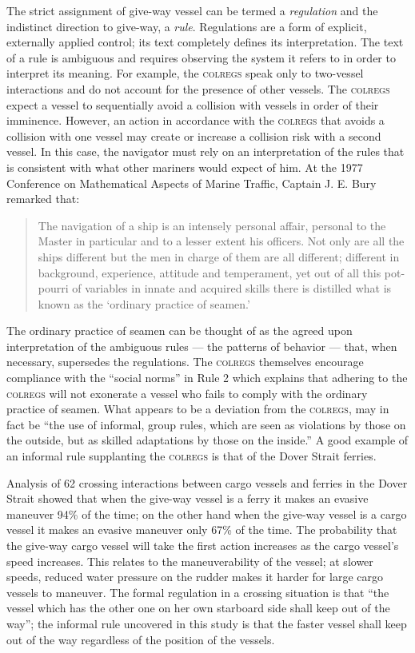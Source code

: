 \documentclass[twoside,symmetric,notoc]{tufte-book}
\begin{document}
\par{%
The strict assignment of give-way vessel can be termed a \textit{regulation} and the indistinct direction to give-way, a \textit{rule}. Regulations are a form of explicit, externally applied control; its text completely defines its interpretation. The text of a rule is ambiguous and requires observing the system it refers to in order to interpret its meaning.\cite{Taylor_1988} For example, the \textsc{colregs} speak only to two-vessel interactions and do not account for the presence of other vessels. The \textsc{colregs} expect a vessel to sequentially avoid a collision with vessels in order of their imminence. However, an action in accordance with the \textsc{colregs} that avoids a collision with one vessel may create or increase a collision risk with a second vessel.\cite{Stitt}\cite{Gottfried} In this case, the navigator must rely on an interpretation of the rules that is consistent with what other mariners would expect of him. At the 1977 Conference on Mathematical Aspects of Marine Traffic, Captain J. E. Bury remarked that:
\begin{quotation}
The navigation of a ship is an intensely personal affair, personal to the Master in particular and to a lesser extent his officers. Not only are all the ships different but the men in charge of them are all different; different in background, experience, attitude and temperament, yet out of all this pot-pourri of variables in innate and acquired skills there is distilled what is known as the `ordinary practice of seamen.'\cite{Bury}
\end{quotation}
The ordinary practice of seamen can be thought of as the agreed upon interpretation of the ambiguous rules --- the patterns of behavior --- that, when necessary, supersedes the regulations. The \textsc{colregs} themselves encourage compliance with the ``social norms'' in Rule 2 which explains that adhering to the \textsc{colregs} will not exonerate a vessel who fails to comply with the ordinary practice of seamen.\cite{USCG} What appears to be a deviation from the \textsc{colregs}, may in fact be ``the use of informal, group rules, which are seen as violations by those on the outside, but as skilled adaptations by those on the inside.''\cite{Hale} A good example of an informal rule supplanting the \textsc{colregs} is that of the Dover Strait ferries.
}
\par{%
Analysis of 62 crossing interactions between cargo vessels and ferries in the Dover Strait showed that when the give-way vessel is a ferry it makes an evasive maneuver 94\% of the time; on the other hand when the give-way vessel is a cargo vessel it makes an evasive maneuver only 67\% of the time. The probability that the give-way cargo vessel will take the first action increases as the cargo vessel's speed increases. This relates to the maneuverability of the vessel; at slower speeds, reduced water pressure on the rudder makes it harder for large cargo vessels to maneuver. The formal regulation in a crossing situation is that ``the vessel which has the other one on her own starboard side shall keep out of the way'';\cite{USCG} the informal rule uncovered in this study is that the faster vessel shall keep out of the way regardless of the position of the vessels.\cite{Chauvin}
}
\end{document}
